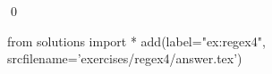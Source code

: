 
\begin{ex} 
  \label{ex:regex4}
  
  \qed
\end{ex} 
\begin{python0}
from solutions import *
add(label="ex:regex4",
    srcfilename='exercises/regex4/answer.tex') 
\end{python0}
